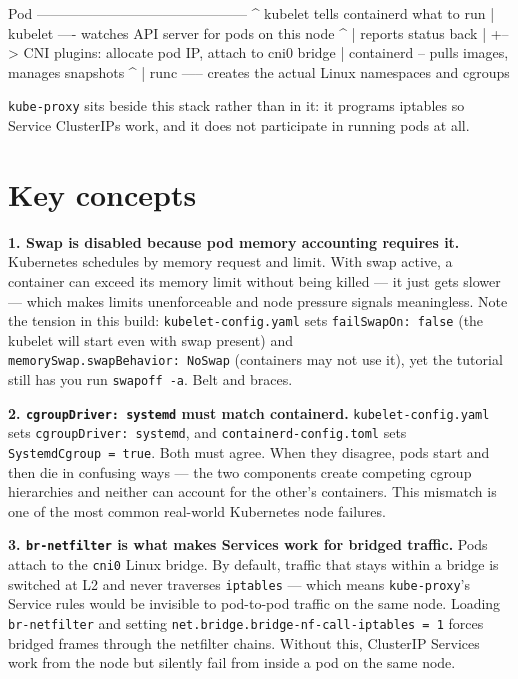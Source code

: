 \documentclass[11pt,oneside]{report}
\begin{document}
\begin{outlst}
    Pod  ---------------------------------------------
      ^   kubelet tells containerd what to run
      |
  kubelet ---- watches API server for pods on this node
      ^   |    reports status back
      |   +--> CNI plugins: allocate pod IP, attach to cni0 bridge
      |
 containerd -- pulls images, manages snapshots
      ^
      |
    runc ----- creates the actual Linux namespaces and cgroups
\end{outlst}

\texttt{kube-proxy}
sits beside this
stack rather than in
it: it programs
iptables so Service
ClusterIPs work, and
it does not
participate in
running pods at all.

\hypertarget{key-concepts-9}{%
\section{Key
concepts}\label{key-concepts-9}}

\textbf{1. Swap is
disabled because pod
memory accounting
requires it.}
Kubernetes schedules
by memory request
and limit. With swap
active, a container
can exceed its
memory limit without
being killed --- it
just gets slower ---
which makes limits
unenforceable and
node pressure
signals meaningless.
Note the tension in
this build:
\texttt{kubelet-}\allowbreak{}\texttt{config.}\allowbreak{}\texttt{yaml}
sets
\texttt{failSwapOn:}\allowbreak{}\texttt{\ false}
(the kubelet will
start even with swap
present) and
\texttt{memorySwap.}\allowbreak{}\texttt{swapBehavior:}\allowbreak{}\texttt{\ NoSwap}
(containers may not
use it), yet the
tutorial still has
you run
\texttt{swapoff\ -a}.
Belt and braces.

\textbf{2.
\texttt{cgroupDriver:}\allowbreak{}\texttt{\ systemd}
must match
containerd.}
\texttt{kubelet-}\allowbreak{}\texttt{config.}\allowbreak{}\texttt{yaml}
sets
\texttt{cgroupDriver:}\allowbreak{}\texttt{\ systemd},
and
\texttt{containerd-}\allowbreak{}\texttt{config.}\allowbreak{}\texttt{toml}
sets
\texttt{SystemdCgroup\ =\ true}.
Both must agree.
When they disagree,
pods start and then
die in confusing
ways --- the two
components create
competing cgroup
hierarchies and
neither can account
for the other's
containers. This
mismatch is one of
the most common
real-world
Kubernetes node
failures.

\textbf{3.
\texttt{br-netfilter}
is what makes
Services work for
bridged traffic.}
Pods attach to the
\texttt{cni0} Linux
bridge. By default,
traffic that stays
within a bridge is
switched at L2 and
never traverses
\texttt{iptables}
--- which means
\texttt{kube-proxy}'s
Service rules would
be invisible to
pod-to-pod traffic
on the same node.
Loading
\texttt{br-netfilter}
and setting
\texttt{net.}\allowbreak{}\texttt{bridge.}\allowbreak{}\texttt{bridge-}\allowbreak{}\texttt{nf-}\allowbreak{}\texttt{call-}\allowbreak{}\texttt{iptables\ =\ 1}
forces bridged
frames through the
netfilter chains.
Without this,
ClusterIP Services
work from the node
but silently fail
from inside a pod on
the same node.
\end{document}
